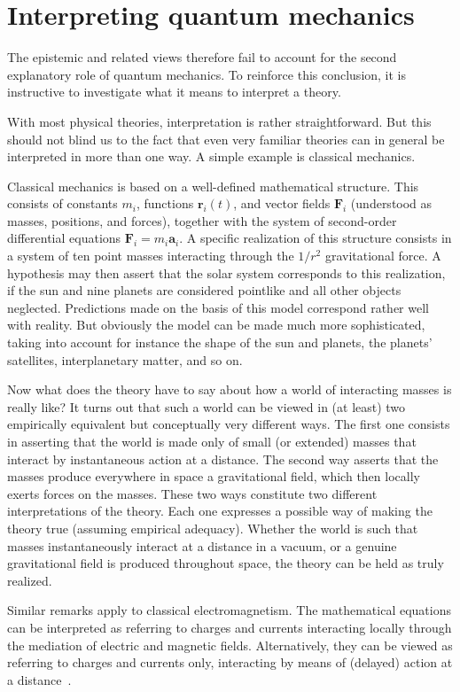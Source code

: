 \documentclass[12pt]{article}
\begin{document}
\section{Interpreting quantum mechanics}
%
The epistemic and related views therefore fail
to account for the second explanatory role of
quantum mechanics.  To reinforce this conclusion,
it is instructive to investigate what it means
to interpret a theory.

With most physical theories, interpretation is rather
straightforward.  But this should not blind us to the
fact that even very familiar theories can in general
be interpreted in more than one way.  A simple
example is classical mechanics.

Classical mechanics is based on a well-defined mathematical
structure.  This consists of constants $m_i$, functions
$\mathbf{r}_i (t)$, and vector fields $\mathbf{F}_i$
(understood as masses, positions, and forces),
together with the system of second-order differential
equations $\mathbf{F}_i = m_i \mathbf{a}_i$.  A
specific realization of this structure consists in
a system of ten point masses
interacting through the $1/r^2$ gravitational
force.  A hypothesis may then
assert that the solar system corresponds to
this realization, if the sun and nine planets are
considered pointlike and all other objects
neglected.  Predictions made on the basis of
this model correspond rather well with reality.
But obviously the model can be made much more
sophisticated, taking into account for instance
the shape of the sun and planets, the planets'
satellites, interplanetary matter, and so on. 

Now what does the theory have to say about
how a world of interacting masses is really like?
It turns out that such a world can be viewed
in (at least) two empirically equivalent but conceptually
very different ways.  The first one consists in asserting
that the world is made only of small (or extended) masses
that interact by instantaneous action at a distance.
The second way asserts that the masses produce
everywhere in space a gravitational field, which
then locally exerts forces on the masses.  These two ways
constitute two different interpretations of the theory.
Each one expresses a possible way of making the
theory true (assuming empirical adequacy).
Whether the world is such that masses instantaneously
interact at a distance in a vacuum, or a
genuine gravitational field is produced throughout
space, the theory can be held as truly realized.

Similar remarks apply to classical electromagnetism.
The mathematical equations can be interpreted
as referring to charges and currents interacting
locally through the mediation of electric and magnetic
fields.  Alternatively, they can be viewed as referring
to charges and currents only, interacting by
means of (delayed) action at a
distance~\cite{wheeler2}.
\end{document}
